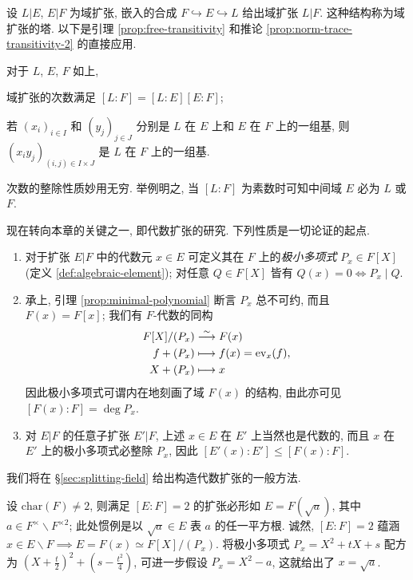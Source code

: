 设 $L|E$, $E|F$ 为域扩张, 嵌入的合成 $F \hookrightarrow E \hookrightarrow L$ 给出域扩张 $L|F$. 这种结构称为域扩张的塔. 以下是引理 \ref{prop:free-transitivity} 和推论 \ref{prop:norm-trace-transitivity-2} 的直接应用. 
\begin{proposition}[次数的塔性质]\label{prop:field-tower-degree}
	对于 $L$, $E$, $F$ 如上,
	\begin{compactitem}
		\item 域扩张的次数满足 $[L:F]=[L:E][E:F]$;
		\item 若 $(x_i)_{i \in I}$ 和 $(y_j)_{j \in J}$ 分别是 $L$ 在 $E$ 上和 $E$ 在 $F$ 上的一组基, 则 $(x_i y_j)_{(i,j) \in I \times J}$ 是 $L$ 在 $F$ 上的一组基.
	\end{compactitem}
\end{proposition}
次数的整除性质妙用无穷. 举例明之, 当 $[L:F]$ 为素数时可知中间域 $E$ 必为 $L$ 或 $F$.

现在转向本章的关键之一, 即代数扩张的研究. 下列性质是一切论证的起点.
\begin{enumerate}
	\item 对于扩张 $E|F$ 中的代数元 $x \in E$ 可定义其在 $F$ 上的\emph{极小多项式} $P_x \in F[X]$ (定义 \ref{def:algebraic-element}); 对任意 $Q \in F[X]$ 皆有 $Q(x) = 0 \iff P_x \mid Q$.
	\item 承上, 引理 \ref{prop:minimal-polynomial} 断言 $P_x$ 总不可约, 而且 $F(x) = F[x]$; 我们有 $F$-代数的同构
		\begin{align*}
			F[X]/(P_x) & \stackrel{\sim}{\longrightarrow} F(x) \\
			f + (P_x) & \longmapsto f(x) = \text{ev}_x(f), \\
			X + (P_x) & \longmapsto x
		\end{align*}
		因此极小多项式可谓内在地刻画了域 $F(x)$ 的结构, 由此亦可见 $[F(x):F] = \deg P_x$.
	\item 对 $E|F$ 的任意子扩张 $E'|F$, 上述 $x \in E$ 在 $E'$ 上当然也是代数的, 而且 $x$ 在 $E'$ 上的极小多项式必整除 $P_x$, 因此 $[E'(x):E'] \leq [F(x):F]$.
\end{enumerate}
我们将在 \S\ref{sec:splitting-field} 给出构造代数扩张的一般方法.

\begin{example}[二次扩张]
	设 $\text{char}(F) \neq 2$, 则满足 $[E:F]=2$ 的扩张必形如 $E = F(\sqrt{a})$, 其中 $a \in F^\times \smallsetminus F^{\times 2}$; 此处惯例是以 $\sqrt{a} \in E$ 表 $a$ 的任一平方根. 诚然, $[E:F]=2$ 蕴涵 $x \in E \smallsetminus F \implies E = F(x) \simeq F[X]/(P_x)$. 将极小多项式 $P_x = X^2 + tX + s$ 配方为 $(X + \frac{t}{2})^2 + (s - \frac{t^2}{4})$, 可进一步假设 $P_x = X^2 - a$, 这就给出了 $x = \sqrt{a}$.
\end{example}

